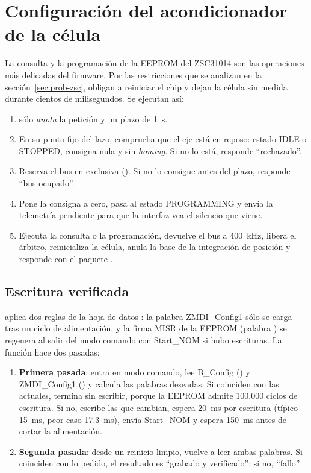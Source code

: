 \section{Configuración del acondicionador de la célula}

La consulta y la programación de la EEPROM del ZSC31014 son las operaciones más delicadas del
firmware. Por las restricciones que se analizan en la sección~\ref{sec:prob-zsc}, obligan a
reiniciar el chip y dejan la célula sin medida durante cientos de milisegundos. Se ejecutan así:

\begin{enumerate}
  \item {} sólo \emph{anota} la petición y un plazo de \SI{1}{\second}.
  \item En su punto fijo del lazo,  comprueba que el eje está en reposo:
        estado IDLE o STOPPED, consigna nula y sin \emph{homing}. Si no lo está, responde
        ``rechazado''.
  \item Reserva el bus en exclusiva (). Si no lo consigue antes del plazo, responde
        ``bus ocupado''.
  \item Pone la consigna a cero, pasa al estado PROGRAMMING y envía la telemetría pendiente para que
        la interfaz vea el silencio que viene.
  \item Ejecuta la consulta o la programación, devuelve el bus a \SI{400}{\kilo\hertz}, libera el
        árbitro, reinicializa la célula, anula la base de la integración de posición y responde con
        el paquete .
\end{enumerate}

\subsection{Escritura verificada}

 aplica dos reglas de la hoja de datos \cite{zsc31014}: la palabra
ZMDI\_Config1 sólo se carga tras un ciclo de alimentación, y la firma MISR de la EEPROM (palabra
) se regenera al salir del modo comando con Start\_NOM si hubo escrituras. La función
hace dos pasadas:

\begin{enumerate}
  \item \textbf{Primera pasada}: entra en modo comando, lee B\_Config () y
        ZMDI\_Config1 () y calcula las palabras deseadas. Si coinciden con las
        actuales, termina sin escribir, porque la EEPROM admite 100.000 ciclos de escritura. Si no,
        escribe las que cambian, espera \SI{20}{\milli\second} por escritura (típico
        \SI{15}{\milli\second}, peor caso \SI{17.3}{\milli\second}), envía Start\_NOM y espera
        \SI{150}{\milli\second} antes de cortar la alimentación.
  \item \textbf{Segunda pasada}: desde un reinicio limpio, vuelve a leer ambas palabras. Si
        coinciden con lo pedido, el resultado es ``grabado y verificado''; si no, ``fallo''.
\end{enumerate}


